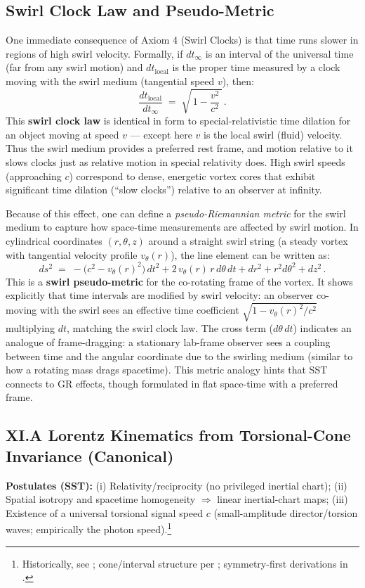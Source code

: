 \documentclass[10pt,reprint,aps,onecolumn,nofootinbib]{revtex4-2}
\begin{document}
	\subsection*{Swirl Clock Law and Pseudo-Metric}
	One immediate consequence of Axiom 4 (Swirl Clocks) is that time runs slower in regions of high swirl velocity. Formally, if $dt_{\infty}$ is an interval of the universal time (far from any swirl motion) and $dt_{\text{local}}$ is the proper time measured by a clock moving with the swirl medium (tangential speed $v$), then:
	\[
		\frac{dt_{\text{local}}}{dt_{\infty}} \;=\; \sqrt{\,1 - \frac{v^2}{c^2}\,}\,.
	\]
	This \textbf{swirl clock law} is identical in form to special-relativistic time dilation for an object moving at speed $v$ — except here $v$ is the local swirl (fluid) velocity. Thus the swirl medium provides a preferred rest frame, and motion relative to it slows clocks just as relative motion in special relativity does. High swirl speeds (approaching $c$) correspond to dense, energetic vortex cores that exhibit significant time dilation (“slow clocks”) relative to an observer at infinity.

	Because of this effect, one can define a \emph{pseudo-Riemannian metric} for the swirl medium to capture how space-time measurements are affected by swirl motion. In cylindrical coordinates $(r,\theta,z)$ around a straight swirl string (a steady vortex with tangential velocity profile $v_{\theta}(r)$), the line element can be written as:
	\[
		ds^2 \;=\; -\big(c^2 - v_{\theta}(r)^2\big)\,dt^2 + 2\,v_{\theta}(r)\,r\,d\theta\,dt + dr^2 + r^2 d\theta^2 + dz^2\,.
	\]
	This is a \textbf{swirl pseudo-metric} for the co-rotating frame of the vortex. It shows explicitly that time intervals are modified by swirl velocity: an observer co-moving with the swirl sees an effective time coefficient $\sqrt{1 - v_{\theta}(r)^2/c^2}$ multiplying $dt$, matching the swirl clock law. The cross term ($d\theta\,dt$) indicates an analogue of frame-dragging: a stationary lab-frame observer sees a coupling between time and the angular coordinate due to the swirling medium (similar to how a rotating mass drags spacetime). This metric analogy hints that SST connects to GR effects, though formulated in flat space-time with a preferred frame.


    \subsection*{XI.A \; Lorentz Kinematics from Torsional-Cone Invariance (Canonical)}
        \textbf{Postulates (SST):} (i) Relativity/reciprocity (no privileged inertial chart); (ii) Spatial isotropy and spacetime homogeneity $\Rightarrow$ linear inertial-chart maps; (iii) Existence of a universal torsional signal speed $c$ (small-amplitude director/torsion waves; empirically the photon speed).\footnote{Historically, see \cite{Einstein1905}; cone/interval structure per \cite{Minkowski1909}; symmetry-first derivations in \cite{LevyLeblond1976}.}
\end{document}
